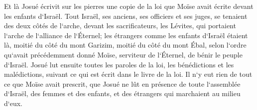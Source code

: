 \verse Et là Josué écrivit sur les pierres une copie de la loi que Moïse avait écrite devant les enfants d`Israël. 
\verse Tout Israël, ses anciens, ses officiers et ses juges, se tenaient des deux côtés de l`arche, devant les sacrificateurs, les Lévites, qui portaient l`arche de l`alliance de l`Éternel; les étrangers comme les enfants d`Israël étaient là, moitié du côté du mont Garizim, moitié du côté du mont Ébal, selon l`ordre qu`avait précédemment donné Moïse, serviteur de l`Éternel, de bénir le peuple d`Israël. 
\verse Josué lut ensuite toutes les paroles de la loi, les bénédictions et les malédictions, suivant ce qui est écrit dans le livre de la loi. 
\verse Il n`y eut rien de tout ce que Moïse avait prescrit, que Josué ne lût en présence de toute l`assemblée d`Israël, des femmes et des enfants, et des étrangers qui marchaient au milieu d`eux. 

